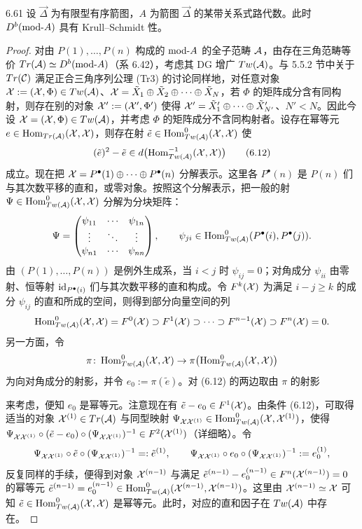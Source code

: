\begin{proposition}{6.61}
设 $\vec{\Delta}$ 为有限型有序箭图，$A$ 为箭图 $\vec{\Delta}$ 的某带关系式路代数。此时 $D^{b}(\mathrm{mod}\text{-}A)$ 具有 Krull--Schmidt 性。
\end{proposition}

\begin{proof}
对由 $P(1),\dots,P(n)$ 构成的 $\mathrm{mod}\text{-}A$ 的全子范畴 $\mathcal{A}$，由存在三角范畴等价 $Tr(\mathcal{A})\simeq D^{b}(\mathrm{mod}\text{-}A)$（系 6.42），考虑其 DG 增广 $Tw(\mathcal{A})$。与 5.5.2 节中关于 $Tr(\mathcal{C})$ 满足正合三角序列公理 (Tr3) 的讨论同样地，对任意对象 $\mathcal{X}:=(\mathcal{X},\Phi)\in Tw(\mathcal{A})$、$\mathcal{X}=\tilde X_1\oplus\tilde X_2\oplus\cdots\oplus\tilde X_N$，若 $\Phi$ 的矩阵成分含有同构射，则存在别的对象 $\mathcal{X}':=(\mathcal{X}',\Phi')$ 使得 $\mathcal{X}'=\tilde X'_1\oplus\cdots\oplus\tilde X'_{N'}$、$N'<N$。因此今设 $\mathcal{X}=(\mathcal{X},\Phi)\in Tw(\mathcal{A})$，并考虑 $\Phi$ 的矩阵成分不含同构射者。设存在幂等元 $e\in\operatorname{Hom}_{Tr(\mathcal{A})}(\mathcal{X},\mathcal{X})$，则存在射 $\tilde e\in\operatorname{Hom}^{0}_{Tw(\mathcal{A})}(\mathcal{X},\mathcal{X})$ 使
\begin{equation}
(\tilde e)^{2}-\tilde e\in d\bigl(\operatorname{Hom}^{-1}_{Tw(\mathcal{A})}(\mathcal{X},\mathcal{X})\bigr) \tag{6.12}
\end{equation}
成立。现在把 $\mathcal{X}=P^{\bullet}(1)\oplus\cdots\oplus P^{\bullet}(n)$ 分解表示。这里各 $P^{\bullet}(n)$ 是 $P(n)$ 们与其次数平移的直和，或零对象。按照这个分解表示，把一般的射 $\Psi\in\operatorname{Hom}^{0}_{Tw(\mathcal{A})}(\mathcal{X},\mathcal{X})$ 分解为分块矩阵：
\[
\Psi=
\begin{pmatrix}
\psi_{11} & \cdots & \psi_{1n}\\
\vdots & \ddots & \vdots\\
\psi_{n1} & \cdots & \psi_{nn}
\end{pmatrix},
\qquad
\psi_{ji}\in\operatorname{Hom}^{0}_{Tw(\mathcal{A})}(P^{\bullet}(i),P^{\bullet}(j)).
\]
由 $(P(1),\dots,P(n))$ 是例外生成系，当 $i<j$ 时 $\psi_{ij}=0$；对角成分 $\psi_{ii}$ 由零射、恒等射 $\mathrm{id}_{P^{\bullet}(i)}$ 们与其次数平移的直和构成。令 $F^{k}(\mathcal{X})$ 为满足 $i-j\ge k$ 的成分 $\psi_{ij}$ 的直和所成的空间，则得到部分向量空间的列
\[
\operatorname{Hom}^{0}_{Tw(\mathcal{A})}(\mathcal{X},\mathcal{X})=F^{0}(\mathcal{X})\supset F^{1}(\mathcal{X})\supset\cdots\supset F^{n-1}(\mathcal{X})\supset F^{n}(\mathcal{X})=0.
\]
另一方面，令
\[
\pi\colon\operatorname{Hom}^{0}_{Tw(\mathcal{A})}(\mathcal{X},\mathcal{X})\to\pi\bigl(\operatorname{Hom}^{0}_{Tw(\mathcal{A})}(\mathcal{X},\mathcal{X})\bigr)
\]
为向对角成分的射影，并令 $e_0:=\pi(\tilde e)$。对 (6.12) 的两边取由 $\pi$ 的射影

来考虑，便知 $e_0$ 是幂等元。注意现在有 $\tilde e-e_0\in F^{1}(\mathcal{X})$。由条件 (6.12)，可取得适当的对象 $\mathcal{X}^{(1)}\in Tr(\mathcal{A})$ 与同型映射 $\Psi_{\mathcal{X}\mathcal{X}^{(1)}}\in\operatorname{Hom}^{0}_{Tw(\mathcal{A})}(\mathcal{X},\mathcal{X}^{(1)})$，使得 $\Psi_{\mathcal{X}\mathcal{X}^{(1)}}\circ(\tilde e-e_0)\circ(\Psi_{\mathcal{X}\mathcal{X}^{(1)}})^{-1}\in F^{2}(\mathcal{X}^{(1)})$（详细略）。令
\[
\Psi_{\mathcal{X}\mathcal{X}^{(1)}}\circ\tilde e\circ(\Psi_{\mathcal{X}\mathcal{X}^{(1)}})^{-1}=:\tilde e^{(1)},\qquad
\Psi_{\mathcal{X}\mathcal{X}^{(1)}}\circ e_0\circ(\Psi_{\mathcal{X}\mathcal{X}^{(1)}})^{-1}:=e_0^{(1)},
\]
反复同样的手续，便得到对象 $\mathcal{X}^{(n-1)}$ 与满足 $\tilde e^{(n-1)}-e_0^{(n-1)}\in F^{n}(\mathcal{X}^{(n-1)})=0$ 的幂等元 $\tilde e^{(n-1)}=e_0^{(n-1)}\in\operatorname{Hom}^{0}_{Tw(\mathcal{A})}(\mathcal{X}^{(n-1)},\mathcal{X}^{(n-1)})$。这里由 $\mathcal{X}^{(n-1)}\simeq\mathcal{X}$ 可知 $\tilde e\in\operatorname{Hom}^{0}_{Tw(\mathcal{A})}(\mathcal{X},\mathcal{X})$ 是幂等元。此时，对应的直和因子在 $Tw(\mathcal{A})$ 中存在。
\end{proof}

